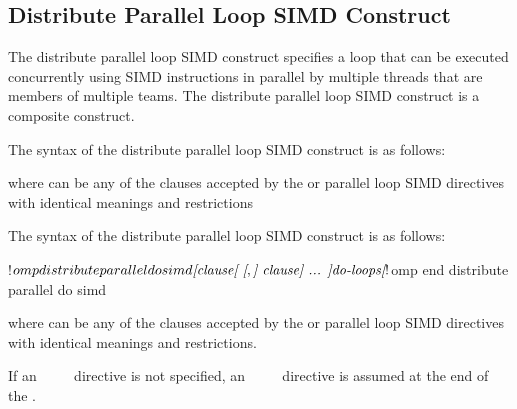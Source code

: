 \subsection{Distribute Parallel Loop SIMD Construct}
\label{subsec:Distribute Parallel Loop SIMD Construct}
\summary
The distribute parallel loop SIMD construct specifies a loop that can be executed
concurrently using SIMD instructions in parallel by multiple threads that are members
of multiple teams. The distribute parallel loop SIMD construct is a composite construct.

\syntax
\begin{ccppspecific}
The syntax of the distribute parallel loop SIMD construct is as follows:

\begin{ompcPragma}
#pragma omp distribute parallel for simd \plc{\}
            \plc{[clause[ [},\plc{] clause] ... ] newline}
    \plc{for-loops}
\end{ompcPragma}

where  can be any of the clauses accepted by the  or parallel loop
SIMD directives with identical meanings and restrictions
\end{ccppspecific}

\begin{fortranspecific}
The syntax of the distribute parallel loop SIMD construct is as follows:

\begin{ompfPragma}
!$omp distribute parallel do simd \plc{[clause[ [},\plc{] clause] ... ]}
    \plc{do-loops}
\plc{[}!$omp end distribute parallel do simd\plc{]}
\end{ompfPragma}

where  can be any of the clauses accepted by the  or parallel loop
SIMD directives with identical meanings and restrictions.

If an ~~~~ directive is not specified, an
~~~~ directive is assumed at the end of the .
\end{fortranspecific}

